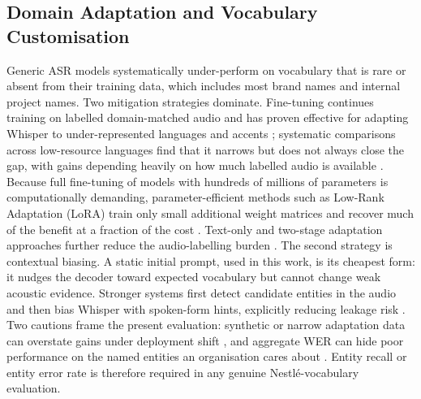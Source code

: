 \documentclass[12pt]{report}
\begin{document}
\subsection{Domain Adaptation and Vocabulary Customisation}
Generic ASR models systematically under-perform on vocabulary that is rare or absent from their training data, which includes most brand names and internal project names. Two mitigation strategies dominate. Fine-tuning continues training on labelled domain-matched audio and has proven effective for adapting Whisper to under-represented languages and accents \cite{daouad2024optimizing,polat2024implementation}; systematic comparisons across low-resource languages find that it narrows but does not always close the gap, with gains depending heavily on how much labelled audio is available \cite{whisperfinetune2024}. Because full fine-tuning of models with hundreds of millions of parameters is computationally demanding, parameter-efficient methods such as Low-Rank Adaptation (LoRA) train only small additional weight matrices and recover much of the benefit at a fraction of the cost \cite{ankita2026exploring}. Text-only and two-stage adaptation approaches further reduce the audio-labelling burden \cite{fang2025textonly,zheng2026twostage}. The second strategy is contextual biasing. A static initial prompt, used in this work, is its cheapest form: it nudges the decoder toward expected vocabulary but cannot change weak acoustic evidence. Stronger systems first detect candidate entities in the audio and then bias Whisper with spoken-form hints, explicitly reducing leakage risk \cite{li2024cbwhisper}. Two cautions frame the present evaluation: synthetic or narrow adaptation data can overstate gains under deployment shift \cite{tran2025das}, and aggregate WER can hide poor performance on the named entities an organisation cares about \cite{durmus2026contextual}. Entity recall or entity error rate is therefore required in any genuine Nestl\'e-vocabulary evaluation.
\end{document}
